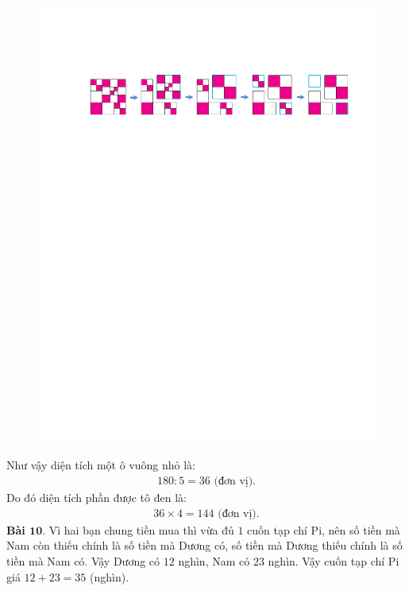 \begin{multicols}{2}
\begin{figure}[H]
		\includegraphics[width= 1\linewidth]{10}
		\vspace*{-15pt}
	\end{figure}
	Như vậy diện tích một ô vuông nhỏ là: 
	\begin{align*}
		180:5 = 36 \text{ (đơn vị).}
	\end{align*}
	Do đó diện tích phần được tô đen là: 
	\begin{align*}
		36\times 4 = 144 \text{ (đơn vị).}
	\end{align*}
	\textbf{\color{toancuabi}Bài $\pmb{10.}$} Vì hai bạn chung tiền mua thì vừa đủ $1$ cuốn tạp chí Pi, nên số tiền mà Nam còn thiếu chính là số tiền mà Dương có, số tiền mà Dương thiếu chính là số tiền mà Nam có. Vậy Dương có $12$ nghìn, Nam có $23$ nghìn. Vậy cuốn tạp chí Pi giá $12+23=35$ (nghìn).
\end{multicols}
